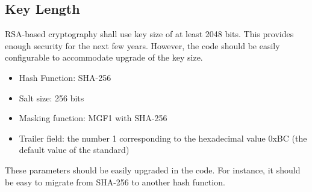 \documentclass[a4paper,10pt]{article}
\begin{document}
\subsection{Key Length}
RSA-based cryptography shall use key size of at least 2048 bits. This provides enough security for the next few years. However, the code should be easily configurable to 
accommodate upgrade of the key size.

\begin{itemize}
\item Hash Function: SHA-256
\item Salt size: 256 bits
\item Masking function: MGF1 with SHA-256
\item Trailer field: the number 1 corresponding to the hexadecimal value 0xBC (the default value of the standard)
\end{itemize}

These parameters should be easily upgraded in the code. For instance, it should be easy to migrate from SHA-256 to another hash function.



\end{document}

